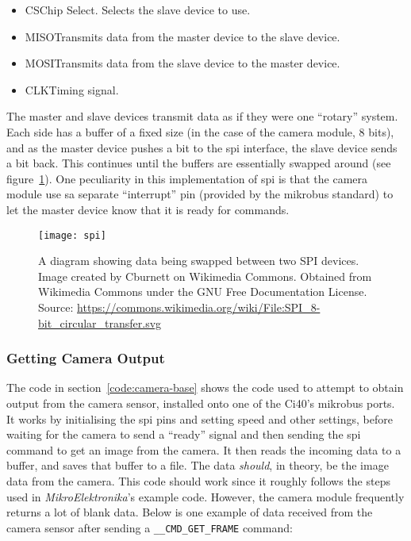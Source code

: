 \begin{itemize}
  \item CS\textemdash{}Chip Select. Selects the slave device to use.
  \item MISO\textemdash{}Transmits data from the master device to the slave
  device.
  \item MOSI\textemdash{}Transmits data from the slave device to the master
  device.
  \item CLK\textemdash{}Timing signal.
\end{itemize}

The master and slave devices transmit data as if they were one ``rotary''
system. Each side has a buffer of a fixed size (in the case of the camera
module, 8 bits), and as the master device pushes a bit to the \acrshort{spi}
interface, the slave device sends a bit back. This continues until the
buffers are essentially swapped around (see figure~\ref{fig:spi}). One
peculiarity in this implementation of \acrshort{spi} is that the camera
module use sa separate ``interrupt'' pin (provided by the \gls{mikrobus}
standard) to let the master device know that it is ready for commands.

\begin{figure}[h]
  \centering
  \texttt{[image: spi]}
  \caption{A diagram showing data being swapped between two SPI devices.
  Image created by Cburnett on Wikimedia Commons. Obtained from Wikimedia
  Commons under the GNU Free Documentation License. Source: 
  \url{https://commons.wikimedia.org/wiki/File:SPI_8-bit_circular_transfer.svg}}
  \label{fig:spi}
\end{figure}

\subsubsection{Getting Camera Output}
The code in section~\ref{code:camera-base} shows the code used to attempt to
obtain output from the camera sensor, installed onto one of the Ci40's
\gls{mikrobus} ports. It works by initialising the \acrshort{spi} pins and
setting speed and other settings, before waiting for the camera to send a
``ready'' signal and then sending the \acrshort{spi} command to get an image
from the camera. It then reads the incoming data to a buffer, and saves that
buffer to a file. The data \textit{should}, in theory, be the image data from
the camera. This code should work since it roughly follows the steps used in
\textit{MikroElektronika}'s example code. However, the camera module
frequently returns a lot of blank data. Below is one example of data received
from the camera sensor after sending a \texttt{\_\_CMD\_GET\_FRAME} command:

